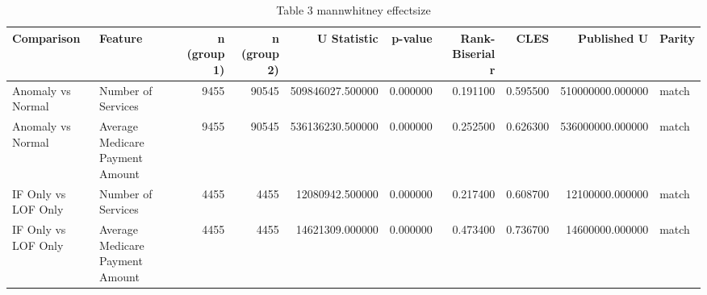 \begin{table}
\caption{Table 3 mannwhitney effectsize}
\label{tab:table_3_mannwhitney_effectsize}
\begin{tabular}{llrrrrrrrl}
\toprule
Comparison & Feature & n (group 1) & n (group 2) & U Statistic & p-value & Rank-Biserial r & CLES & Published U & Parity \\
\midrule
Anomaly vs Normal & Number of Services & 9455 & 90545 & 509846027.500000 & 0.000000 & 0.191100 & 0.595500 & 510000000.000000 & match \\
Anomaly vs Normal & Average Medicare Payment Amount & 9455 & 90545 & 536136230.500000 & 0.000000 & 0.252500 & 0.626300 & 536000000.000000 & match \\
IF Only vs LOF Only & Number of Services & 4455 & 4455 & 12080942.500000 & 0.000000 & 0.217400 & 0.608700 & 12100000.000000 & match \\
IF Only vs LOF Only & Average Medicare Payment Amount & 4455 & 4455 & 14621309.000000 & 0.000000 & 0.473400 & 0.736700 & 14600000.000000 & match \\
\bottomrule
\end{tabular}
\end{table}
